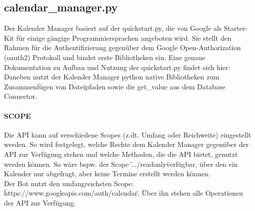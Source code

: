         \subsection{calendar\_manager.py}
            Der Kalender Manager basiert auf der quickstart.py, die von Google als Starter-Kit für einige gängige Programmiersprachen angeboten wird. Sie stellt den Rahmen für die Authentifizierung gegenüber dem Google Open-Authorization (oauth2) Protokoll und bindet erste Bibliotheken ein. Eine genaue Dokumentation zu Aufbau und Nutzung der quickstart.py findet sich hier: \cite{pythonQuickstart} \\
            Daneben nutzt der Kalender Manager python native Bibliotheken zum Zusammenfügen von Dateipfaden sowie die get\_value aus dem Database Connector.

            \paragraph{SCOPE}
                Die API kann auf verschiedene Scopes (z.dt. Umfang oder Reichweite) eingestellt werden. So wird festgelegt, welche Rechte dem Kalender Manager gegenüber der API zur Verfügung stehen und welche Methoden, die die API bietet, genutzt werden können. So wäre bspw. der Scope \".../readonly\" verfügbar, über den ein Kalender nur abgefragt, aber keine Termine erstellt werden können.\\
                Der Bot nutzt den umfangreichsten Scope: \"https://www.googleapis.com/auth/calendar\". Über ihn stehen alle Operationen der API zur Verfügung.

